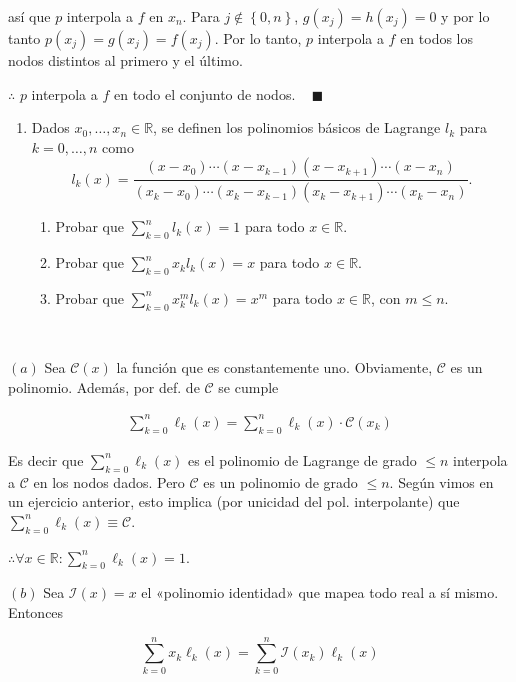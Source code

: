 \documentclass[12pt]{article}
\begin{document}
así que $p$ interpola a $f$ en $x_n$. Para $j \not\in \left\{ 0, n \right\} $,
$g(x_j) = h(x_j) = 0$ y por lo tanto $p(x_j) = g(x_j) = f(x_j)$. Por lo tanto,
$p$ interpola a $f$ en todos los nodos distintos al primero y el último. 

$\therefore $ $p$ interpola a $f$ en todo el conjunto de nodos. ~ $\blacksquare$


\pagebreak 

\begin{myframe}
\begin{enumerate}
\item[4.] Dados $x_0, \ldots, x_n \in \mathbb{R}$, se definen los polinomios básicos de Lagrange $l_k$ para $k = 0, \ldots, n$ como
\[
l_k(x) = \frac{(x - x_0)\cdots(x - x_{k-1})(x - x_{k+1})\cdots(x - x_n)}
{(x_k - x_0)\cdots(x_k - x_{k-1})(x_k - x_{k+1})\cdots(x_k - x_n)}.
\]
\begin{enumerate}
\item[a)] Probar que $\sum_{k=0}^n l_k(x) = 1$ para todo $x \in \mathbb{R}$.
\item[b)] Probar que $\sum_{k=0}^n x_k l_k(x) = x$ para todo $x \in \mathbb{R}$.
\item[c)] Probar que $\sum_{k=0}^n x_k^m l_k(x) = x^m$ para todo $x \in \mathbb{R}$, con $m \le n$.
\end{enumerate}
\end{enumerate}
\end{myframe}

~ 

$(a)$ Sea $\mathcal{C}(x)$ la función que es constantemente uno. Obviamente,
$\mathcal{C}$ es un polinomio. Además, por def. de $\mathcal{C}$ se cumple 

\begin{align*}
    \sum_{k=0}^n \ell_k(x) = \sum_{k=0}^n \ell_k(x) \cdot \mathcal{C}(x_k)
\end{align*}

Es decir que $\sum_{k=0}^n \ell_k(x)$ es el polinomio de Lagrange de grado $\leq
n$ interpola a $\mathcal{C}$ en los nodos dados. Pero $\mathcal{C}$ es un
polinomio de grado $\leq n$. Según vimos en un ejercicio anterior, esto implica
(por unicidad del pol. interpolante) que $\sum_{k=0}^n \ell_k(x) \equiv
\mathcal{C}$.

$\therefore \forall  x \in \mathbb{R}: \sum_{k=0}^n \ell_k(x) = 1$.

$(b)$ Sea $\mathcal{I}(x) = x$ el «polinomio identidad» que mapea todo real a sí
mismo. Entonces 

\begin{equation*}
    \sum_{k=0}^n x_k \ell_k(x) = \sum_{k=0}^n \mathcal{I}(x_k)\ell_k(x)
\end{equation*}
\end{document}

